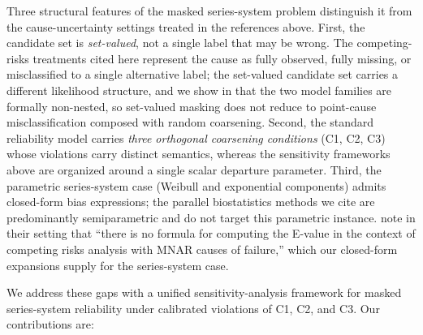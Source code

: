 Three structural features of the masked series-system problem distinguish
it from the cause-uncertainty settings treated in the references above.
First, the candidate set is \emph{set-valued}, not a single label that may
be wrong. The competing-risks treatments cited here represent the cause as
fully observed, fully missing, or misclassified to a single alternative
label; the set-valued candidate set carries a different likelihood
structure, and we show in  that the two model
families are formally non-nested, so set-valued masking does not reduce to
point-cause misclassification composed with random coarsening. Second, the
standard reliability model carries \emph{three orthogonal coarsening
conditions} (C1, C2, C3) whose violations carry distinct semantics, whereas
the sensitivity frameworks above are organized around a single scalar
departure parameter. Third, the parametric series-system case (Weibull and
exponential components) admits closed-form bias expressions; the parallel
biostatistics methods we cite are predominantly semiparametric and do not
target this parametric instance. \citet{Bakoyannis2025} note in their
setting that ``there is no formula for computing the E-value in the context
of competing risks analysis with MNAR causes of failure,'' which our
closed-form expansions supply for the series-system case.

We address these gaps with a unified sensitivity-analysis framework for
masked series-system reliability under calibrated violations of C1, C2, and
C3. Our contributions are:

